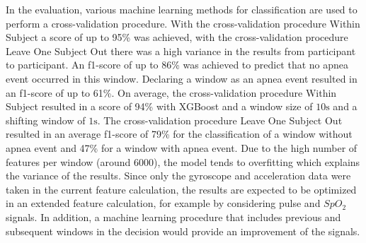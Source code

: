 In the evaluation, various machine learning methods for classification are used to perform a cross-validation procedure. 
With the cross-validation procedure {\glqq Within Subject\grqq} a score of up to 95\% was achieved, with the cross-validation procedure {\glqq Leave One Subject Out\grqq} there was a high variance in the results from participant to participant. 
An f1-score of up to 86\% was achieved to predict that no apnea event occurred in this window. 
Declaring a window as an apnea event resulted in an f1-score of up to 61\%.
On average, the cross-validation procedure {\glqq Within Subject\grqq} resulted in a score of 94\% with XGBoost and a window size of $10\si{\s}$ and a shifting window of $1\si{\s}$. 
The cross-validation procedure {\glqq Leave One Subject Out\grqq} resulted in an average f1-score of 79\% for the classification of a window without apnea event and 47\% for a window with apnea event. 
Due to the high number of features per window (around 6000), the model tends to overfitting which explains the variance of the results.
Since only the gyroscope and acceleration data were taken in the current feature calculation, the results are expected to be optimized in an extended feature calculation, for example by considering pulse and $SpO_2$ signals. 
In addition, a machine learning procedure that includes previous and subsequent windows in the decision would provide an improvement of the signals.

\cleardoublepage